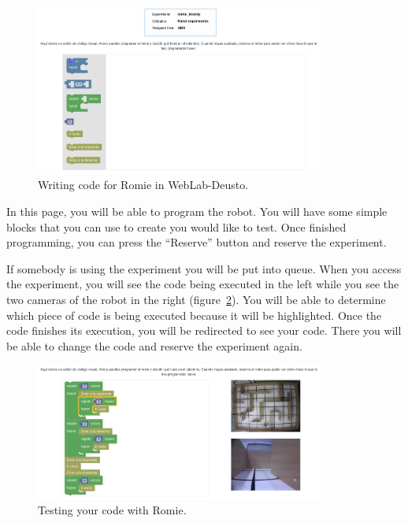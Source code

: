 \begin{figure}[!htbp]
	\centering
	\includegraphics[width=0.85\textwidth]{fig/manuals/blockly/reservation}
	\caption{Writing code for Romie in WebLab-Deusto.}
	\label{fig:man:blockly_reserve}
\end{figure}

In this page, you will be able to program the robot. You will have some simple blocks that you can
use to create you would like to test. Once finished programming, you can press the ``Reserve''
button and reserve the experiment.

If somebody is using the experiment you will be put into queue. When you access the experiment, you
will see the code being executed in the left while you see the two cameras of the robot in the
right (figure~\ref{fig:man:blockly_playing}). You will be able to determine which piece of code is
being executed because it will be highlighted. Once the code finishes its execution, you will be
redirected to see your code. There you will be able to change the code and reserve the experiment
again.

\begin{figure}[!htbp]
	\centering
	\includegraphics[width=0.85\textwidth]{fig/manuals/blockly/executing}
	\caption{Testing your code with Romie.}
	\label{fig:man:blockly_playing}
\end{figure}

